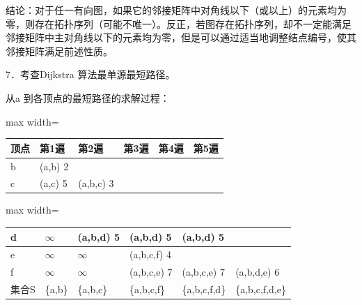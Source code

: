 \documentclass[UTF8,11pt]{ctexart}
\begin{document}
结论：对于任一有向图，如果它的邻接矩阵中对角线以下（或以上）的元素均为零，则存在拓扑序列（可能不唯一）。反正，若图存在拓扑序列，却不一定能满足邻接矩阵中主对角线以下的元素均为零，但是可以通过适当地调整结点编号，使其邻接矩阵满足前述性质。


7．考查Dijkstra 算法最单源最短路径。


从a 到各顶点的最短路径的求解过程：


\begin{center}\begin{adjustbox}{max width=\linewidth}\begin{tabular}{|>{\raggedright\arraybackslash}p{\dimexpr(\linewidth-12\tabcolsep-7\arrayrulewidth)/6\relax}|>{\raggedright\arraybackslash}p{\dimexpr(\linewidth-12\tabcolsep-7\arrayrulewidth)/6\relax}|>{\raggedright\arraybackslash}p{\dimexpr(\linewidth-12\tabcolsep-7\arrayrulewidth)/6\relax}|>{\raggedright\arraybackslash}p{\dimexpr(\linewidth-12\tabcolsep-7\arrayrulewidth)/6\relax}|>{\raggedright\arraybackslash}p{\dimexpr(\linewidth-12\tabcolsep-7\arrayrulewidth)/6\relax}|>{\raggedright\arraybackslash}p{\dimexpr(\linewidth-12\tabcolsep-7\arrayrulewidth)/6\relax}|}\hline
顶点 & 第1遍 & 第2遍 & 第3遍 & 第4遍 & 第5遍\\\hline
b & (a,b) 2 &  &  &  & \\\hline
c & (a,c) 5 & (a,b,c) 3 &  &  & \\\hline\end{tabular}\end{adjustbox}\end{center}

\begin{center}\begin{adjustbox}{max width=\linewidth}\begin{tabular}{|>{\raggedright\arraybackslash}p{\dimexpr(\linewidth-12\tabcolsep-7\arrayrulewidth)/6\relax}|>{\raggedright\arraybackslash}p{\dimexpr(\linewidth-12\tabcolsep-7\arrayrulewidth)/6\relax}|>{\raggedright\arraybackslash}p{\dimexpr(\linewidth-12\tabcolsep-7\arrayrulewidth)/6\relax}|>{\raggedright\arraybackslash}p{\dimexpr(\linewidth-12\tabcolsep-7\arrayrulewidth)/6\relax}|>{\raggedright\arraybackslash}p{\dimexpr(\linewidth-12\tabcolsep-7\arrayrulewidth)/6\relax}|>{\raggedright\arraybackslash}p{\dimexpr(\linewidth-12\tabcolsep-7\arrayrulewidth)/6\relax}|}\hline
d & \(\displaystyle \infty\) & (a,b,d) 5 & (a,b,d) 5 & (a,b,d) 5 & \\\hline
e & \(\displaystyle \infty\) & \(\displaystyle \infty\) & (a,b,c,f) 4 &  & \\\hline
f & \(\displaystyle \infty\) & \(\displaystyle \infty\) & (a,b,c,e) 7 & (a,b,c,e) 7 & (a,b,d,e) 6\\\hline
集合S & \{a,b\} & \{a,b,c\} & \{a,b,c,f\} & \{a,b,c,f,d\} & \{a,b,c,f,d,e\}\\\hline\end{tabular}\end{adjustbox}\end{center}
\end{document}
